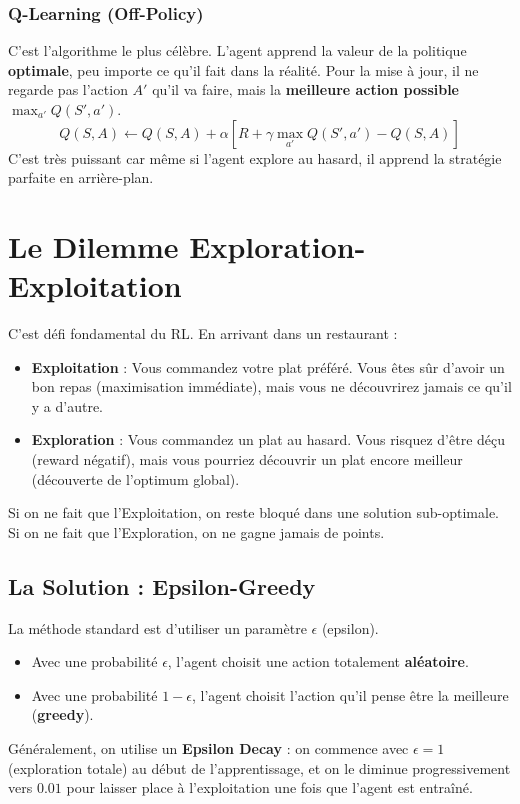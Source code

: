 \documentclass[a4paper,12pt]{report}
\begin{document}
\subsection{Q-Learning (Off-Policy)}
C'est l'algorithme le plus célèbre. L'agent apprend la valeur de la politique \textbf{optimale}, peu importe ce qu'il fait dans la réalité.
Pour la mise à jour, il ne regarde pas l'action $A'$ qu'il va faire, mais la \textbf{meilleure action possible} $\max_{a'} Q(S', a')$.
\[ Q(S,A) \leftarrow Q(S,A) + \alpha [ R + \gamma \max_{a'} Q(S', a') - Q(S,A) ] \]
C'est très puissant car même si l'agent explore au hasard, il apprend la stratégie parfaite en arrière-plan.

\chapter{Le Dilemme Exploration-Exploitation}

C'est défi fondamental du RL. En arrivant dans un restaurant :
\begin{itemize}
    \item \textbf{Exploitation} : Vous commandez votre plat préféré. Vous êtes sûr d'avoir un bon repas (maximisation immédiate), mais vous ne découvrirez jamais ce qu'il y a d'autre.
    \item \textbf{Exploration} : Vous commandez un plat au hasard. Vous risquez d'être déçu (reward négatif), mais vous pourriez découvrir un plat encore meilleur (découverte de l'optimum global).
\end{itemize}

Si on ne fait que l'Exploitation, on reste bloqué dans une solution sub-optimale. Si on ne fait que l'Exploration, on ne gagne jamais de points.

\section{La Solution : Epsilon-Greedy}
La méthode standard est d'utiliser un paramètre $\epsilon$ (epsilon).
\begin{itemize}
    \item Avec une probabilité $\epsilon$, l'agent choisit une action totalement \textbf{aléatoire}.
    \item Avec une probabilité $1-\epsilon$, l'agent choisit l'action qu'il pense être la meilleure (\textbf{greedy}).
\end{itemize}
Généralement, on utilise un \textbf{Epsilon Decay} : on commence avec $\epsilon=1$ (exploration totale) au début de l'apprentissage, et on le diminue progressivement vers $0.01$ pour laisser place à l'exploitation une fois que l'agent est entraîné.
\end{document}
